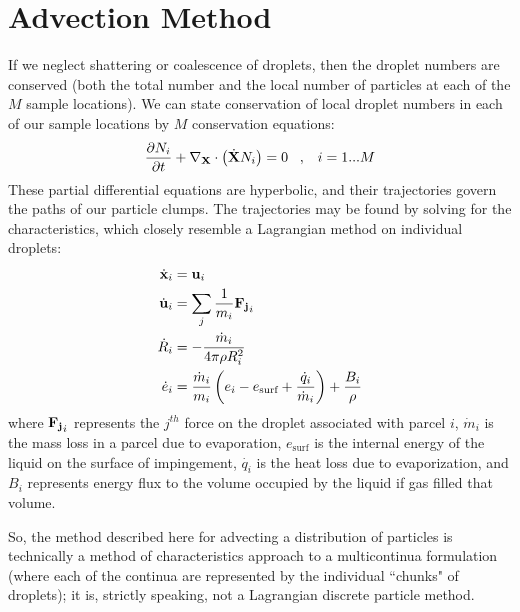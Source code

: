 \documentclass{article}
\begin{document}
\section{Advection Method}
If we neglect shattering or coalescence of droplets, then the droplet numbers are conserved (both the total number 
and the local number of particles at each of the $M$ sample locations). We can state conservation of local 
droplet numbers in each of our sample locations by $M$ conservation equations:
\begin{equation}
\frac{\partial N_i}{\partial t} + \nabla_{\bf X} \cdot \left(\dot {\bf X} N_i \right) = 0 \; \; \; , \;\;\; i=1...M
\end{equation}
These partial differential equations are hyperbolic, and their trajectories govern the paths of our particle clumps.
The trajectories may be found by solving for the characteristics, which closely resemble a Lagrangian method on individual droplets:
\begin{equation}
\begin{aligned}
\dot{\bf x}_i & = {\bf u}_i  \\
\dot{\bf u}_i & = \sum_j \frac{1}{m_i} {\bf F_j}_i \\
\dot{R}_i & = -\frac{\dot{m}_i}{4 \pi \rho R_i^2} \\
\dot{e}_i & = \frac{\dot{m}_i}{m_i} \left( e_i - e_{\text{surf}} + \frac{\dot{q}_i}{\dot{m}_i}\right) + \frac{B_i}{\rho}
\end{aligned}
\end{equation}
where ${\bf F_j}_i$ represents the $j^{th}$ force on the droplet associated with parcel $i$, $\dot{m}_i$ is the mass loss 
in a parcel due to evaporation, $e_{\text{surf}}$ is the internal energy of the liquid on the surface of impingement, 
$\dot{q_i}$ is the heat loss due to evaporization, and $B_i$ represents energy flux to the volume occupied by the liquid if gas filled 
that volume.

So, the method described here for advecting a distribution of particles is technically a method of characteristics approach 
to a multicontinua formulation (where each of the continua are represented by the individual ``chunks" of droplets); it is, strictly 
speaking, not a Lagrangian discrete particle method.
\end{document}
